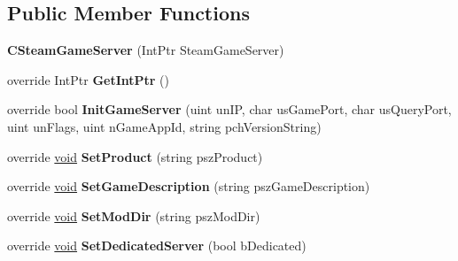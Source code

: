 \subsection*{Public Member Functions}
\begin{DoxyCompactItemize}
\item 
\hypertarget{classValve_1_1Steamworks_1_1CSteamGameServer_a886a578ee56ad9527a4ef484c188bd8a}{}{\bfseries C\+Steam\+Game\+Server} (Int\+Ptr Steam\+Game\+Server)\label{classValve_1_1Steamworks_1_1CSteamGameServer_a886a578ee56ad9527a4ef484c188bd8a}

\item 
\hypertarget{classValve_1_1Steamworks_1_1CSteamGameServer_ac360bfd65b859fe35ccd19fdf182c452}{}override Int\+Ptr {\bfseries Get\+Int\+Ptr} ()\label{classValve_1_1Steamworks_1_1CSteamGameServer_ac360bfd65b859fe35ccd19fdf182c452}

\item 
\hypertarget{classValve_1_1Steamworks_1_1CSteamGameServer_a1f1ad89b367f70c1eb476e9a91e096fa}{}override bool {\bfseries Init\+Game\+Server} (uint un\+I\+P, char us\+Game\+Port, char us\+Query\+Port, uint un\+Flags, uint n\+Game\+App\+Id, string pch\+Version\+String)\label{classValve_1_1Steamworks_1_1CSteamGameServer_a1f1ad89b367f70c1eb476e9a91e096fa}

\item 
\hypertarget{classValve_1_1Steamworks_1_1CSteamGameServer_a541d9d6371483059aef3ba911cfb23ce}{}override \hyperlink{SDL__audio_8h_a52835ae37c4bb905b903cbaf5d04b05f}{void} {\bfseries Set\+Product} (string psz\+Product)\label{classValve_1_1Steamworks_1_1CSteamGameServer_a541d9d6371483059aef3ba911cfb23ce}

\item 
\hypertarget{classValve_1_1Steamworks_1_1CSteamGameServer_afedbaf2a41f5847bcbca65a1f095927a}{}override \hyperlink{SDL__audio_8h_a52835ae37c4bb905b903cbaf5d04b05f}{void} {\bfseries Set\+Game\+Description} (string psz\+Game\+Description)\label{classValve_1_1Steamworks_1_1CSteamGameServer_afedbaf2a41f5847bcbca65a1f095927a}

\item 
\hypertarget{classValve_1_1Steamworks_1_1CSteamGameServer_acf7d79e7ecbbfd72c6c19dcda189875a}{}override \hyperlink{SDL__audio_8h_a52835ae37c4bb905b903cbaf5d04b05f}{void} {\bfseries Set\+Mod\+Dir} (string psz\+Mod\+Dir)\label{classValve_1_1Steamworks_1_1CSteamGameServer_acf7d79e7ecbbfd72c6c19dcda189875a}

\item 
\hypertarget{classValve_1_1Steamworks_1_1CSteamGameServer_a19e5cbc56f802e634546581af1583c03}{}override \hyperlink{SDL__audio_8h_a52835ae37c4bb905b903cbaf5d04b05f}{void} {\bfseries Set\+Dedicated\+Server} (bool b\+Dedicated)\label{classValve_1_1Steamworks_1_1CSteamGameServer_a19e5cbc56f802e634546581af1583c03}


\end{DoxyCompactItemize}
